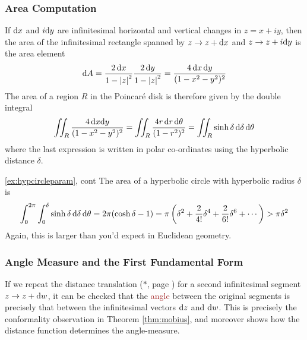 \subsubsection*{Area Computation}

If ${\mathrm{d} x}$ and $i{\mathrm{d} y}$ are infinitesimal horizontal and vertical changes in $z=x+iy$, then the area of the infinitesimal rectangle spanned by $z\to z+{\mathrm{d} x}$ and $z\to z+i{\mathrm{d} y}$ is the area element
\[
	{\mathrm{d} A}=\frac{2\,{\mathrm{d} x}}{1-\left| z\right|^2}\frac{2\,{\mathrm{d} y}}{1-\left| z\right|^2} =\frac{4\,{\mathrm{d} x}\,{\mathrm{d} y}}{(1-x^2-y^2)^2}
\]
The area of a region $R$ in the Poincaré disk is therefore given by the double integral
\[
	\iint_R\frac{4\,{\mathrm{d} x}{\mathrm{d} y}}{(1-x^2-y^2)^2}=\iint_R\frac{4r\,{\mathrm{d} r}\,{\mathrm{d}\theta}}{(1-r^2)^2} =\iint_R\sinh\delta\,\mathrm{d}\delta\,{\mathrm{d}\theta}
\]
where the last expression is written in polar co-ordinates using the hyperbolic distance $\delta$.
	
\begin{example*}{\ref{ex:hypcircleparam}, cont}
	The area of a hyperbolic circle with hyperbolic radius $\delta$ is
	\[
		\int_0^{2\pi}\int_0^\delta\sinh\delta\,\mathrm{d}\delta\,{\mathrm{d}\theta} =2\pi(\cosh\delta-1) =\pi\left(\delta^2+\frac{2}{4!}\delta^4+\frac{2}{6!}\delta^6+\cdots\right)>\pi\delta^2
	\]
	Again, this is larger than you'd expect in Euclidean geometry.
\end{example*}


\pagebreak[3]



\subsubsection*{Angle Measure and the First Fundamental Form}\label{pg:hypareaext}

If we repeat the distance translation ($\ast$, page \pageref{pg:hyp1stform}) for a second infinitesimal \textcolor{mGreen}{segment} $z\to z+{\mathrm{d} w}$, it can be checked that the \textcolor{Brown}{angle} between the original segments is precisely that between the infinitesimal vectors ${\mathrm{d} z}$ and ${\mathrm{d} w}$. This is precisely the conformality observation in Theorem \ref{thm:mobius}, and moreover shows how the distance function determines the angle-measure.\smallbreak

